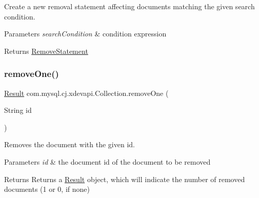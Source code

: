 Create a new removal statement affecting documents matching the given search condition.


\begin{DoxyParams}{Parameters}
{\em search\+Condition} & condition expression \\
\hline
\end{DoxyParams}
\begin{DoxyReturn}{Returns}
\mbox{\hyperlink{interfacecom_1_1mysql_1_1cj_1_1xdevapi_1_1_remove_statement}{Remove\+Statement}} 
\end{DoxyReturn}
\mbox{\label{interfacecom_1_1mysql_1_1cj_1_1xdevapi_1_1_collection_a60a716403dff168734c61966dccf016c}} 
\subsubsection{\texorpdfstring{remove\+One()}{removeOne()}}
{\footnotesize\ttfamily \mbox{\hyperlink{interfacecom_1_1mysql_1_1cj_1_1xdevapi_1_1_result}{Result}} com.\+mysql.\+cj.\+xdevapi.\+Collection.\+remove\+One (\begin{DoxyParamCaption}\item[{String}]{id }\end{DoxyParamCaption})}

Removes the document with the given id.


\begin{DoxyParams}{Parameters}
{\em id} & the document id of the document to be removed \\
\hline
\end{DoxyParams}
\begin{DoxyReturn}{Returns}
Returns a \mbox{\hyperlink{interfacecom_1_1mysql_1_1cj_1_1xdevapi_1_1_result}{Result}} object, which will indicate the number of removed documents (1 or 0, if none) 
\end{DoxyReturn}
\mbox{\label{interfacecom_1_1mysql_1_1cj_1_1xdevapi_1_1_collection_a7c5c6cf51afb021bd225926bd22a3c67}} 

